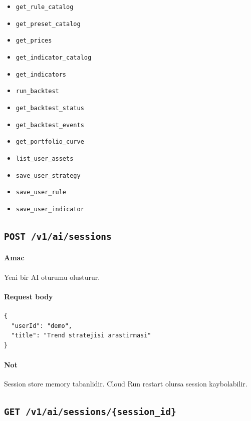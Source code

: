 \documentclass[11pt,a4paper]{article}
\begin{document}
\begin{itemize}[leftmargin=1.5em]
    \item \texttt{get\_rule\_catalog}
    \item \texttt{get\_preset\_catalog}
    \item \texttt{get\_prices}
    \item \texttt{get\_indicator\_catalog}
    \item \texttt{get\_indicators}
    \item \texttt{run\_backtest}
    \item \texttt{get\_backtest\_status}
    \item \texttt{get\_backtest\_events}
    \item \texttt{get\_portfolio\_curve}
    \item \texttt{list\_user\_assets}
    \item \texttt{save\_user\_strategy}
    \item \texttt{save\_user\_rule}
    \item \texttt{save\_user\_indicator}
\end{itemize}

\subsection{\texttt{POST /v1/ai/sessions}}

\paragraph{Amac}
Yeni bir AI oturumu olusturur.

\paragraph{Request body}
\begin{lstlisting}
{
  "userId": "demo",
  "title": "Trend stratejisi arastirmasi"
}
\end{lstlisting}

\paragraph{Not}
Session store memory tabanlidir. Cloud Run restart olursa session kaybolabilir.

\subsection{\texttt{GET /v1/ai/sessions/\{session\_id\}}}
\end{document}
